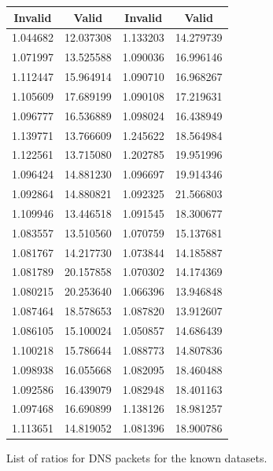 \documentclass{article}
\theoremstyle{remark}
\theoremstyle{definition}
\theoremstyle{definition}
\theoremstyle{definition}
\begin{document}
\begin{figure}
\begin{center}
\begin{tabular}{c|c||c|c}
Invalid & Valid & Invalid & Valid\\
\hline\hline
1.044682&12.037308&1.133203&14.279739\\
1.071997&13.525588&1.090036&16.996146\\
1.112447&15.964914&1.090710&16.968267\\
1.105609&17.689199&1.090108&17.219631\\
1.096777&16.536889&1.098024&16.438949\\
1.139771&13.766609&1.245622&18.564984\\
1.122561&13.715080&1.202785&19.951996\\
1.096424&14.881230&1.096697&19.914346\\
1.092864&14.880821&1.092325&21.566803\\
1.109946&13.446518&1.091545&18.300677\\
1.083557&13.510560&1.070759&15.137681\\
1.081767&14.217730&1.073844&14.185887\\
1.081789&20.157858&1.070302&14.174369\\
1.080215&20.253640&1.066396&13.946848\\
1.087464&18.578653&1.087820&13.912607\\
1.086105&15.100024&1.050857&14.686439\\
1.100218&15.786644&1.088773&14.807836\\
1.098938&16.055668&1.082095&18.460488\\
1.092586&16.439079&1.082948&18.401163\\
1.097468&16.690899&1.138126&18.981257\\
1.113651&14.819052&1.081396&18.900786\\

\end{tabular}
\end{center}
\caption{List of ratios for DNS packets for the known datasets.}\label{RatioTable}
\end{figure}
\end{document}
